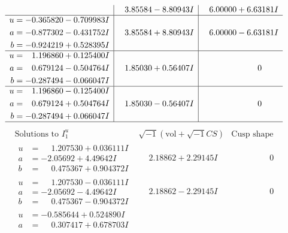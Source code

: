 \documentclass[1p]{elsarticle_modified}
\theoremstyle{definition}
\newcommand{\I}{\sqrt{-1}}
\begin{document}
$$\begin{array}{c|c|c}
 & \phantom{-}3.85584 - 8.80943 I & \phantom{-}6.00000 + 6.63181 I \\ \hline\begin{aligned}
u &= -0.365820 - 0.709983 I \\
a &= -0.877302 - 0.431752 I \\
b &= -0.924219 + 0.528395 I\end{aligned}
 & \phantom{-}3.85584 + 8.80943 I & \phantom{-}6.00000 - 6.63181 I \\ \hline\begin{aligned}
u &= \phantom{-}1.196860 + 0.125400 I \\
a &= \phantom{-}0.679124 - 0.504764 I \\
b &= -0.287494 - 0.066047 I\end{aligned}
 & \phantom{-}1.85030 + 0.56407 I & \phantom{-0.000000 } 0 \\ \hline\begin{aligned}
u &= \phantom{-}1.196860 - 0.125400 I \\
a &= \phantom{-}0.679124 + 0.504764 I \\
b &= -0.287494 + 0.066047 I\end{aligned}
 & \phantom{-}1.85030 - 0.56407 I & \phantom{-0.000000 } 0\\
 \hline 
 \end{array}$$\newpage$$\begin{array}{c|c|c}  
\text{Solutions to }I^u_{1}& \I (\text{vol} + \sqrt{-1}CS) & \text{Cusp shape}\\
 \hline 
\begin{aligned}
u &= \phantom{-}1.207530 + 0.036111 I \\
a &= -2.05692 + 4.49642 I \\
b &= \phantom{-}0.475367 + 0.904372 I\end{aligned}
 & \phantom{-}2.18862 + 2.29145 I & \phantom{-0.000000 } 0 \\ \hline\begin{aligned}
u &= \phantom{-}1.207530 - 0.036111 I \\
a &= -2.05692 - 4.49642 I \\
b &= \phantom{-}0.475367 - 0.904372 I\end{aligned}
 & \phantom{-}2.18862 - 2.29145 I & \phantom{-0.000000 } 0 \\ \hline\begin{aligned}
u &= -0.585644 + 0.524890 I \\
a &= \phantom{-}0.307417 + 0.678703 I \\

\end{aligned}
\end{array}$$
\end{document}
